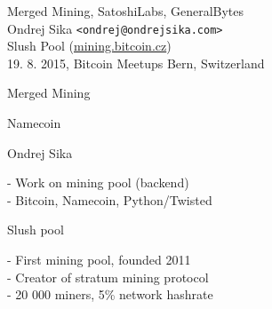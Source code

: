 \documentclass{beamer}
\begin{document}
\begin{frame}

    {\LARGE Merged Mining, SatoshiLabs, GeneralBytes}\\
    \vspace{7mm}
    {\Large Ondrej Sika \lstinline|<ondrej@ondrejsika.com>|}\\
    \vspace{7mm}
    {\large Slush Pool (\url{mining.bitcoin.cz})}\\
    \vspace{7mm}
    19. 8. 2015, Bitcoin Meetups Bern, Switzerland\\

\end{frame}

\begin{frame}

    {\LARGE Merged Mining}\\

\end{frame}

\begin{frame}

    {\LARGE Namecoin}\\

    \vspace{5mm}

\end{frame}

\begin{frame}

    {\LARGE Ondrej Sika}\\

    \vspace{5mm}

    - Work on mining pool (backend)\\
    - Bitcoin, Namecoin, Python/Twisted\\

    \vspace{10mm}

    {\LARGE Slush pool}\\

    \vspace{5mm}

    - First mining pool, founded 2011\\
    - Creator of stratum mining protocol\\
    - 20 000 miners, 5\% network hashrate\\


\end{frame}
\end{document}
